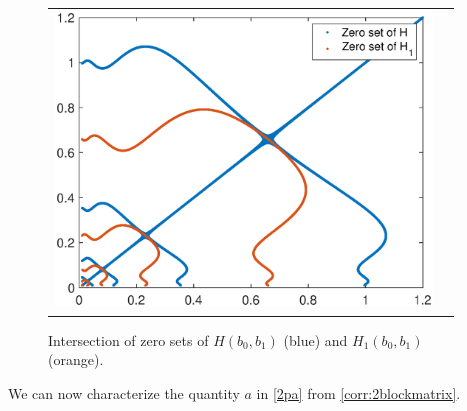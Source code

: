 \documentclass[thesis.tex]{subfiles}
\begin{document}
\begin{figure}
\begin{center}
\begin{tabular}{cc}
\includegraphics[width=10cm]{images/periodic/zeroHoverlap.eps} 
\end{tabular}
\end{center}
\caption[Intersection of zero sets of $H$ and $H_1$]{ Intersection of zero sets of $H(b_0, b_1)$ (blue) and $H_1(b_0, b_1)$ (orange). }
\label{fig:HH1overlap}
\end{figure}

We can now characterize the quantity $a$ in \cref{2pa} from \cref{corr:2blockmatrix}.
\end{document}
